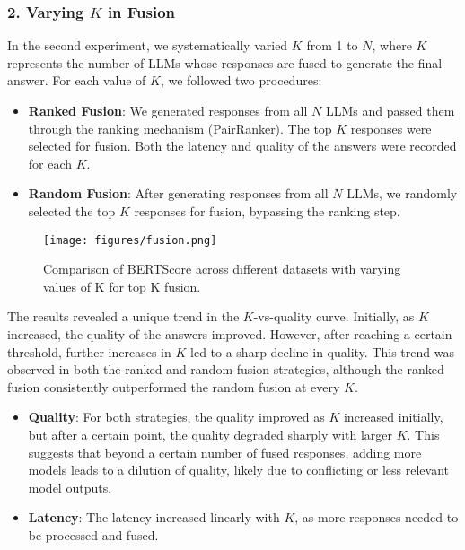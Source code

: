 \documentclass[sigconf,authordraft]{acmart}
\begin{document}
\subsubsection{2. Varying \( K \) in Fusion}
In the second experiment, we systematically varied \( K \) from 1 to \( N \), where \( K \) represents the number of LLMs whose responses are fused to generate the final answer. For each value of \( K \), we followed two procedures:

\begin{itemize}
    \item \textbf{Ranked Fusion}: We generated responses from all \( N \) LLMs and passed them through the ranking mechanism (PairRanker). The top \( K \) responses were selected for fusion. Both the latency and quality of the answers were recorded for each \( K \).
    \item \textbf{Random Fusion}: After generating responses from all \( N \) LLMs, we randomly selected the top \( K \) responses for fusion, bypassing the ranking step.
\end{itemize}


\begin{figure}
    \centering
    \texttt{[image: figures/fusion.png]}
    \caption{Comparison of BERTScore across different datasets with varying values of K for top K fusion.}
    \label{fig:fusion}
\end{figure}

The results revealed a unique trend in the \( K \)-vs-quality curve. Initially, as \( K \) increased, the quality of the answers improved. However, after reaching a certain threshold, further increases in \( K \) led to a sharp decline in quality. This trend was observed in both the ranked and random fusion strategies, although the ranked fusion consistently outperformed the random fusion at every \( K \).

\begin{itemize}
    \item \textbf{Quality}: For both strategies, the quality improved as \( K \) increased initially, but after a certain point, the quality degraded sharply with larger \( K \). This suggests that beyond a certain number of fused responses, adding more models leads to a dilution of quality, likely due to conflicting or less relevant model outputs.
    \item \textbf{Latency}: The latency increased linearly with \( K \), as more responses needed to be processed and fused.
\end{itemize}
\end{document}
